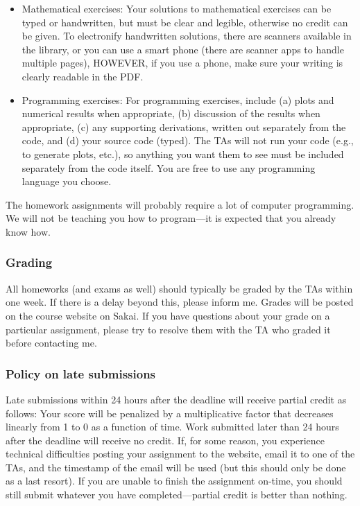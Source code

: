 \documentclass[12pt]{article}
\begin{document}
\begin{itemize}
    \item Mathematical exercises: Your solutions to mathematical exercises can be typed or handwritten, but must be clear and legible, otherwise no credit can be given. To electronify handwritten solutions, there are scanners available in the library, or you can use a smart phone (there are scanner apps to handle multiple pages), HOWEVER, if you use a phone, make sure your writing is clearly readable in the PDF. 
        
    \item Programming exercises: For programming exercises, include (a) plots and numerical results when appropriate, (b) discussion of the results when appropriate, (c) any supporting derivations, written out separately from the code, and (d) your source code (typed). The TAs will not run your code (e.g., to generate plots, etc.), so anything you want them to see must be included separately from the code itself. You are free to use any programming language you choose.
\end{itemize}

The homework assignments will probably require a lot of computer programming. We will not be teaching you how to program---it is expected that you already know how.


\subsubsection*{Grading}
All homeworks (and exams as well) should typically be graded by the TAs within one week. If there is a delay beyond this, please inform me. Grades will be posted on the course website on Sakai. 
If you have questions about your grade on a particular assignment, please try to resolve them with the TA who graded it before contacting me.


\subsubsection*{Policy on late submissions}

Late submissions within 24 hours after the deadline will receive partial credit as follows: Your score will be penalized by a multiplicative factor that decreases linearly from 1 to 0 as a function of time.  Work submitted later than 24 hours after the deadline will receive no credit.  If, for some reason, you experience technical difficulties posting your assignment to the website, email it to one of the TAs, and the timestamp of the email will be used (but this should only be done as a last resort). If you are unable to finish the assignment on-time, you should still submit whatever you have completed---partial credit is better than nothing.
\end{document}
